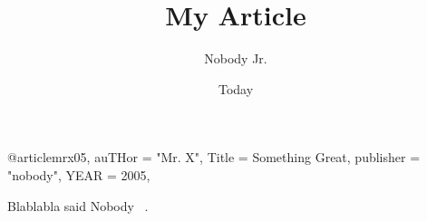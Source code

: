 \documentclass[11pt]{article}
\begin{document}
\title{My Article}
\author{Nobody Jr.}
\date{Today}
\maketitle

@article{mrx05, 
auTHor = "Mr. X", 
Title = {Something Great}, 
publisher = "nobody", 
YEAR = 2005, 
} 

Blablabla said Nobody ~\cite{Nobody06}.

{}

\end{document}
